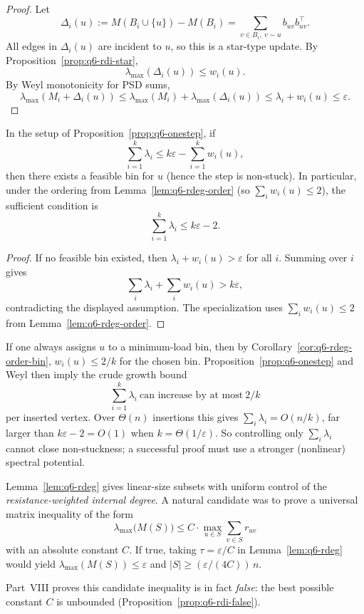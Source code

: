 \begin{proof}
Let
\[
\Delta_i(u):=M(B_i\cup\{u\})-M(B_i)
=\sum_{v\in B_i,\ v\sim u} b_{uv}b_{uv}^\top.
\]
All edges in $\Delta_i(u)$ are incident to $u$, so this is a star-type
update. By Proposition~\ref{prop:q6-rdi-star},
\[
\lambda_{\max}(\Delta_i(u))\le w_i(u).
\]
By Weyl monotonicity for PSD sums,
\[
\lambda_{\max}(M_i+\Delta_i(u))
\le \lambda_{\max}(M_i)+\lambda_{\max}(\Delta_i(u))
\le \lambda_i+w_i(u)\le\varepsilon.
\]
\end{proof}

\begin{corollary}\label{cor:q6-slack}
In the setup of Proposition~\ref{prop:q6-onestep}, if
\[
\sum_{i=1}^k \lambda_i \le k\varepsilon-\sum_{i=1}^k w_i(u),
\]
then there exists a feasible bin for $u$ (hence the step is non-stuck).
In particular, under the ordering from
Lemma~\ref{lem:q6-rdeg-order} (so $\sum_i w_i(u)\le 2$), the sufficient
condition is
\[
\sum_{i=1}^k \lambda_i \le k\varepsilon-2.
\]
\end{corollary}

\begin{proof}
If no feasible bin existed, then $\lambda_i+w_i(u)>\varepsilon$ for all
$i$. Summing over $i$ gives
\[
\sum_i\lambda_i+\sum_i w_i(u)>k\varepsilon,
\]
contradicting the displayed assumption.
The specialization uses $\sum_i w_i(u)\le 2$ from
Lemma~\ref{lem:q6-rdeg-order}.
\end{proof}

\begin{remark}
If one always assigns $u$ to a minimum-load bin, then by
Corollary~\ref{cor:q6-rdeg-order-bin},
$w_i(u)\le 2/k$ for the chosen bin.
Proposition~\ref{prop:q6-onestep} and Weyl then imply the crude growth
bound
\[
\sum_{i=1}^k \lambda_i \ \text{can increase by at most}\ 2/k
\]
per inserted vertex.
Over $\Theta(n)$ insertions this gives
$\sum_i\lambda_i=O(n/k)$, far larger than $k\varepsilon-2=O(1)$ when
$k=\Theta(1/\varepsilon)$.
So controlling only $\sum_i\lambda_i$ cannot close non-stuckness; a
successful proof must use a stronger (nonlinear) spectral potential.
\end{remark}

\begin{remark}
Lemma~\ref{lem:q6-rdeg} gives linear-size subsets with uniform control of
the \emph{resistance-weighted internal degree}. A natural candidate was
to prove a universal matrix inequality of the form
\[
\lambda_{\max}\!\big(M(S)\big)
\le C\cdot
\max_{u\in S}\sum_{v\in S} r_{uv}
\]
with an absolute constant $C$. If true, taking $\tau=\varepsilon/C$ in
Lemma~\ref{lem:q6-rdeg} would yield
$\lambda_{\max}(M(S))\le\varepsilon$ and
$|S|\ge (\varepsilon/(4C))\,n$.

Part~VIII proves this candidate inequality is in fact \emph{false}:
the best possible constant $C$ is unbounded
(Proposition~\ref{prop:q6-rdi-false}).
\end{remark}

